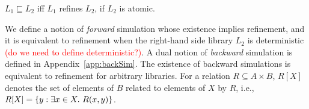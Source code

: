 \begin{theorem}
  $L_1 \sqsubseteq L_2$ if{f} $L_1$ refines $L_2$,
  if $L_2$ is atomic.

\end{theorem}

We define a notion of \emph{forward} simulation whose existence implies refinement, and it is equivalent to refinement when the right-hand side library $L_2$ is deterministic \textcolor{red}{(do we need to define deterministic?)}. A dual notion of \emph{backward} simulation is defined in Appendix~\ref{app:backSim}. The existence of backward simulations is equivalent to refinement for arbitrary libraries.
For a relation $R\subseteq A\times B$, $R[X]$ denotes the set of elements of $B$ related to elements of $X$ by $R$, i.e., $R[X]=\set{y:\exists x\in X.\ R(x,y)}$.



